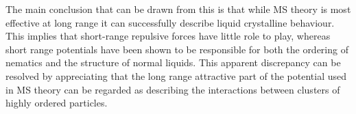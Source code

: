 The main conclusion that can be drawn from this is that while MS theory is most effective at 
long range it can successfully describe liquid crystalline behaviour. This implies that short-range 
repulsive forces have little role to play, whereas short range potentials have been shown to
be responsible for both the ordering of nematics and the structure of normal liquids. This apparent
discrepancy can be resolved by appreciating that the long range attractive 
part of the potential used in MS theory  can be regarded  as describing the interactions 
between clusters of highly ordered particles. 







